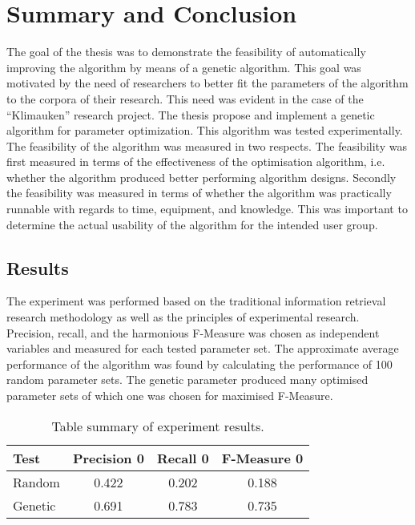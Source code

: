 \chapter{Summary and Conclusion} %
\label{Conclusion} %
The goal of the thesis was to demonstrate the feasibility of automatically improving the \CTC algorithm by means of a genetic algorithm. This goal was motivated by the need of researchers to better fit the parameters of the \CTC algorithm to the corpora of their research. This need was evident in the case of the ``Klimauken'' research project. The thesis propose and implement a genetic algorithm for parameter optimization. This algorithm was tested experimentally. The feasibility of the algorithm was measured in two respects. The feasibility was first measured in terms of the effectiveness of the optimisation algorithm, i.e. whether the algorithm produced better performing algorithm designs. Secondly the feasibility was measured in terms of whether the algorithm was practically runnable with regards to time, equipment, and knowledge. This was important to determine the actual usability of the algorithm for the intended user group.

\section{Results}
The experiment was performed based on the traditional information retrieval research methodology as well as the principles of experimental research. Precision, recall, and the harmonious F-Measure was chosen as independent variables and measured for each tested parameter set. The approximate average performance of the algorithm was found by calculating the performance of 100 random parameter sets. The genetic parameter produced many optimised parameter sets of which one was chosen for maximised F-Measure.

\begin{table}[H]
\begin{center}
\begin{tabular}{|l|ccc|}
\hline
Test & Precision 0 & Recall 0 & F-Measure 0\\ 
\hline
Random 	&   0.422& 	  0.202& 	0.188\\ 
Genetic &   0.691&    0.783&    0.735\\ 
\hline
\end{tabular}
\end{center}
\caption{Table summary of experiment results.}
\label{tab:summarytableresultsconclusion}
\end{table}

